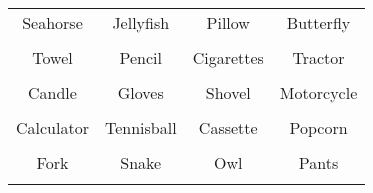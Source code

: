 \documentclass[12pt,a4paper]{article}
\begin{document}
\thispagestyle{empty}
\begin{table}[]
\centering
\Huge
\begin{tabular}{cccc}
 Seahorse& Jellyfish& Pillow& Butterfly\\  & & & \\
 Towel& Pencil& Cigarettes& Tractor\\  & & & \\
 Candle& Gloves& Shovel& Motorcycle\\  & & & \\
 Calculator& Tennisball& Cassette& Popcorn\\  & & & \\
 Fork& Snake& Owl& Pants\\  & & & \\
\end{tabular}
\end{table}
\end{document}
